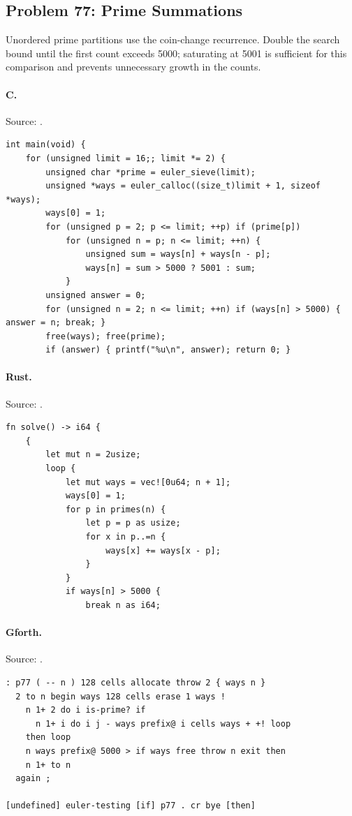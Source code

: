 \subsection{Problem 77: Prime Summations}
\label{walkthrough:p77}
Unordered prime partitions use the coin-change recurrence. Double the search bound until the first count exceeds 5000; saturating at 5001 is sufficient for this comparison and prevents unnecessary growth in the counts.

\paragraph{C.} Source: .
\begin{lstlisting}
int main(void) {
    for (unsigned limit = 16;; limit *= 2) {
        unsigned char *prime = euler_sieve(limit);
        unsigned *ways = euler_calloc((size_t)limit + 1, sizeof *ways);
        ways[0] = 1;
        for (unsigned p = 2; p <= limit; ++p) if (prime[p])
            for (unsigned n = p; n <= limit; ++n) {
                unsigned sum = ways[n] + ways[n - p];
                ways[n] = sum > 5000 ? 5001 : sum;
            }
        unsigned answer = 0;
        for (unsigned n = 2; n <= limit; ++n) if (ways[n] > 5000) { answer = n; break; }
        free(ways); free(prime);
        if (answer) { printf("%u\n", answer); return 0; }
\end{lstlisting}

\paragraph{Rust.} Source: .
\begin{lstlisting}
fn solve() -> i64 {
    {
        let mut n = 2usize;
        loop {
            let mut ways = vec![0u64; n + 1];
            ways[0] = 1;
            for p in primes(n) {
                let p = p as usize;
                for x in p..=n {
                    ways[x] += ways[x - p];
                }
            }
            if ways[n] > 5000 {
                break n as i64;
\end{lstlisting}

\paragraph{Gforth.} Source: .
\begin{lstlisting}
: p77 ( -- n ) 128 cells allocate throw 2 { ways n }
  2 to n begin ways 128 cells erase 1 ways !
    n 1+ 2 do i is-prime? if
      n 1+ i do i j - ways prefix@ i cells ways + +! loop
    then loop
    n ways prefix@ 5000 > if ways free throw n exit then
    n 1+ to n
  again ;

[undefined] euler-testing [if] p77 . cr bye [then]
\end{lstlisting}


